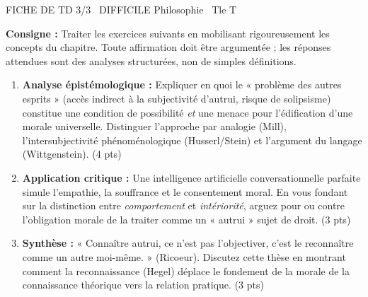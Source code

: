 \documentclass[11pt]{article}
\begin{document}
\begin{tcolorbox}[enhanced,colback=popink,colframe=popink,arc=10pt,boxrule=0pt,left=12pt,right=12pt,top=9pt,bottom=9pt]
{\color{white}\popxbold\small FICHE DE TD 3/3 \textbullet\ DIFFICILE \hfill Philosophie \textbullet\ Tle T\par}
\end{tcolorbox}
\vspace{4pt}
\noindent\textbf{Consigne :} Traiter les exercices suivants en mobilisant rigoureusement les concepts du chapitre. Toute affirmation doit être argumentée ; les réponses attendues sont des analyses structurées, non de simples définitions.

\begin{exercice}
    \begin{enumerate}
        \item \textbf{Analyse épistémologique :} Expliquer en quoi le « problème des autres esprits » (accès indirect à la subjectivité d'autrui, risque de solipsisme) constitue une condition de possibilité \textit{et} une menace pour l'édification d'une morale universelle. Distinguer l'approche par analogie (Mill), l'intersubjectivité phénoménologique (Husserl/Stein) et l'argument du langage (Wittgenstein). (4 pts)
        \item \textbf{Application critique :} Une intelligence artificielle conversationnelle parfaite simule l'empathie, la souffrance et le consentement moral. En vous fondant sur la distinction entre \textit{comportement} et \textit{intériorité}, arguez pour ou contre l'obligation morale de la traiter comme un « autrui » sujet de droit. (3 pts)
        \item \textbf{Synthèse :} « Connaître autrui, ce n'est pas l'objectiver, c'est le reconnaître comme un autre moi-même. » (Ricoeur). Discutez cette thèse en montrant comment la reconnaissance (Hegel) déplace le fondement de la morale de la connaissance théorique vers la relation pratique. (3 pts)
    \end{enumerate}
\end{exercice}
\end{document}
